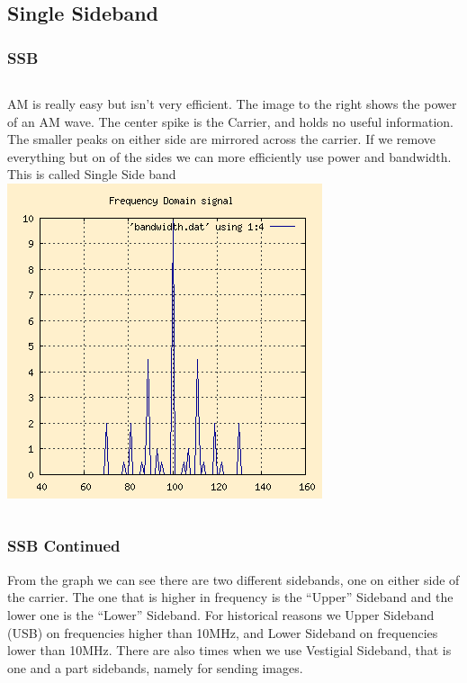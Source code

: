 \documentclass[10pt]{beamer}
\begin{document}
\subsection{Single Sideband}

\begin{frame}
\frametitle{SSB }
\begin{columns}
AM is really easy but isn't very efficient. The image to the right shows the power of an AM wave. The center spike is the Carrier, and holds no useful information. The smaller peaks on either side are mirrored across the carrier. If we remove everything but on of the sides we can more efficiently use power and bandwidth. This is called Single Side band
\includegraphics[width=\textwidth]{amfft.png}
\end{columns}
\end{frame}

\begin{frame}
\frametitle{SSB Continued}
From the graph we can see there are two different sidebands, one on either side of the carrier. The one that is higher in frequency is the ``Upper'' Sideband and the lower one is the ``Lower'' Sideband. For historical reasons we Upper Sideband (USB) on frequencies higher than 10MHz, and Lower Sideband on frequencies lower than 10MHz. There are also times when we use Vestigial Sideband, that is one and a part sidebands, namely for sending images.
\end{frame}
\end{document}
